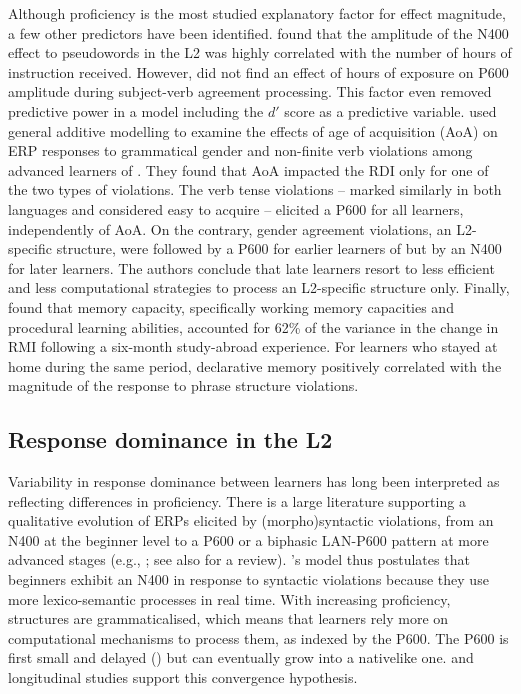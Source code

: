 \documentclass[output=paper,colorlinks,citecolor=brown,modfonts,nonflat]{../langscibook}
\begin{document}
Although proficiency is the most studied explanatory factor for effect magnitude, a few other predictors have been identified. \citet{McLaughlinEtAl2004} found that the amplitude of the N400 effect to pseudowords in the L2 was highly correlated with the number of hours of instruction received. However, \citet{TannerEtAl2013} did not find an effect of hours of exposure on P600 amplitude during subject-verb agreement processing. This factor even removed predictive power in a model including the $d′$ score as a predictive variable. \citet{MeulmanEtAl2015} used general additive modelling to examine the effects of age of acquisition (AoA) on ERP responses to grammatical gender and non-finite verb violations among  advanced learners of . They found that AoA impacted the RDI only for one of the two types of violations. The verb tense violations – marked similarly in both languages and considered easy to acquire – elicited a P600 for all learners, independently of AoA. On the contrary, gender agreement violations, an L2-specific structure, were followed by a P600 for earlier learners of  but by an N400 for later learners. The authors conclude that late learners resort to less efficient and less computational strategies to process an L2-specific structure only. Finally, \citet{Faretta-StutenbergMorgan-Short2018} found that memory capacity, specifically working memory capacities and procedural learning abilities, accounted for 62\% of the variance in the change in RMI following a six-month study-abroad experience. For learners who stayed at home during the same period, declarative memory positively correlated with the magnitude of the response to phrase structure violations.

\subsection{Response dominance in the L2}
\largerpage
Variability in response dominance between learners has long been interpreted as reflecting differences in proficiency. There is a large literature supporting a qualitative evolution of ERPs elicited by (morpho)syntactic violations, from an N400 at the beginner level to a P600 or a biphasic LAN-P600 pattern at more advanced stages (e.g., \citealt{OsterhoutEtAl2006,RossiEtAl2006,Kotz2009,McLaughlinEtAl2010}; see also \citealt{Steinhauer2014} for a review). \citet{SteinhauerEtAl2009}’s model thus postulates that beginners exhibit an N400 in response to syntactic violations because they use more lexico-semantic processes in real time. With increasing proficiency, structures are grammaticalised, which means that learners rely more on computational mechanisms to process them, as indexed by the P600. The P600 is first small and delayed (\citealt{TokowiczMacWhinney2005,RossiEtAl2006}) but can eventually grow into a nativelike one.  and  longitudinal studies support this convergence hypothesis.
\end{document}
